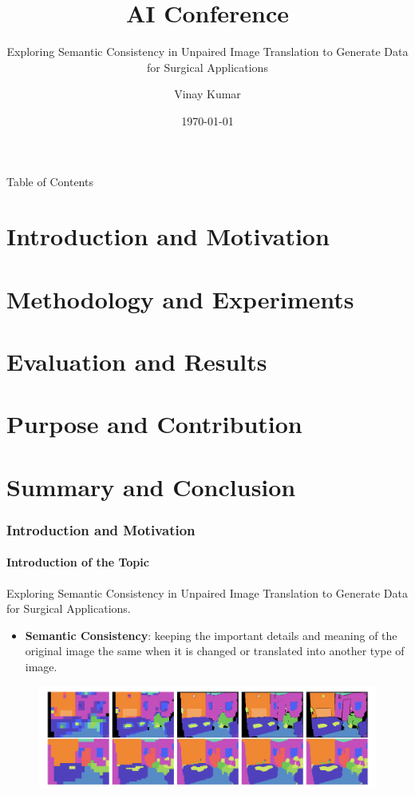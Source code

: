 \documentclass[aspectratio=169, lecture, amberg]{OTHAWbeamer}
\title[Kurztitel]{AI Conference}
\subtitle{Exploring Semantic Consistency in Unpaired Image Translation to Generate Data for Surgical Applications}
\author[Mustermann]{Vinay Kumar}
\date{{\selectlanguage{english}\today}}
\begin{document}
\maketitle

\begin{frame}{Table of Contents}
    \tableofcontents
\end{frame}

\section{Introduction and Motivation}
\section{Methodology and Experiments}

\section{Evaluation and Results}
\section{Purpose and Contribution}
\section{Summary and Conclusion}


\begin{frame}
    \frametitle{Introduction and Motivation}
    \framesubtitle{Introduction of the Topic}
    Exploring Semantic Consistency in Unpaired Image Translation to Generate Data for Surgical Applications.
    \begin{itemize}
        \item \textbf{Semantic Consistency}: keeping the important details and meaning of the original image the same when it is changed or translated into another type of image.  
    \end{itemize}

    \begin{figure}
        \centering
        \includegraphics[width=0.8\linewidth]{semantic.png}
        \caption{\cite{https://cvg.cit.tum.de/_media/spezial/bib/lingni17iros.pdf}}
    \end{figure}

  \end{frame}
\end{document}
